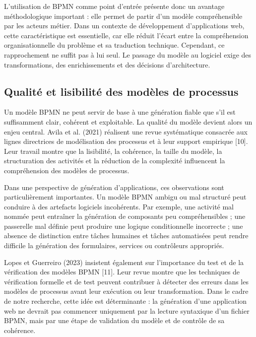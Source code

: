 L'utilisation de BPMN comme point d'entrée présente donc un avantage méthodologique important : elle permet de partir d'un modèle compréhensible par les acteurs métier. Dans un contexte de développement d'applications web, cette caractéristique est essentielle, car elle réduit l'écart entre la compréhension organisationnelle du problème et sa traduction technique. Cependant, ce rapprochement ne suffit pas à lui seul. Le passage du modèle au logiciel exige des transformations, des enrichissements et des décisions d'architecture.

\subsection{Qualité et lisibilité des modèles de processus}

Un modèle BPMN ne peut servir de base à une génération fiable que s'il est suffisamment clair, cohérent et exploitable. La qualité du modèle devient alors un enjeu central. Avila et al. (2021) réalisent une revue systématique consacrée aux lignes directrices de modélisation des processus et à leur support empirique [10]. Leur travail montre que la lisibilité, la cohérence, la taille du modèle, la structuration des activités et la réduction de la complexité influencent la compréhension des modèles de processus.

Dans une perspective de génération d'applications, ces observations sont particulièrement importantes. Un modèle BPMN ambigu ou mal structuré peut conduire à des artefacts logiciels incohérents. Par exemple, une activité mal nommée peut entraîner la génération de composants peu compréhensibles ; une passerelle mal définie peut produire une logique conditionnelle incorrecte ; une absence de distinction entre tâches humaines et tâches automatisées peut rendre difficile la génération des formulaires, services ou contrôleurs appropriés.

Lopes et Guerreiro (2023) insistent également sur l'importance du test et de la vérification des modèles BPMN [11]. Leur revue montre que les techniques de vérification formelle et de test peuvent contribuer à détecter des erreurs dans les modèles de processus avant leur exécution ou leur transformation. Dans le cadre de notre recherche, cette idée est déterminante : la génération d'une application web ne devrait pas commencer uniquement par la lecture syntaxique d'un fichier BPMN, mais par une étape de validation du modèle et de contrôle de sa cohérence.

